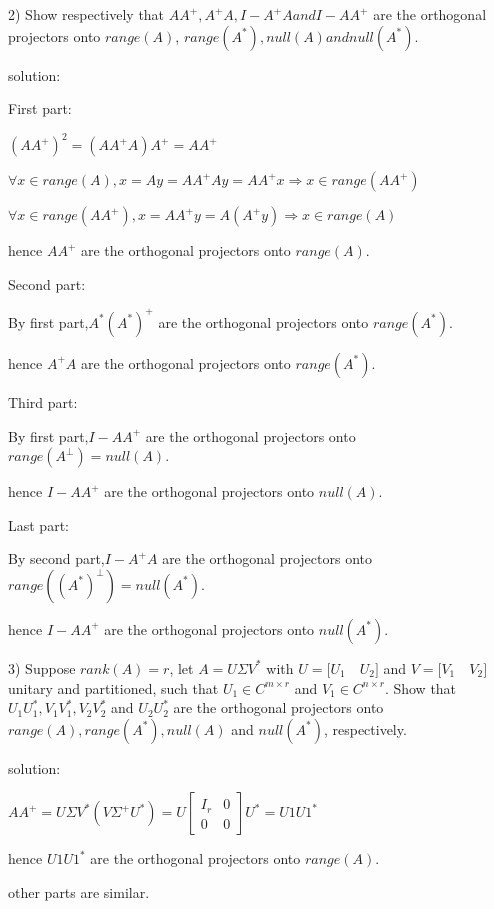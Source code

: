 \documentclass{article}
\begin{document}
\begin{enumerate}
		2) Show respectively that $AA^+, A^+A, I-A^+A and I-AA^+$ are the orthogonal projectors onto $range(A)$, $range(A^*), null(A) and null(A^*)$.
		
		solution:$ $
		
		First part:$ $
		
		$(AA^+)^2=(AA^+A)A^+=AA^+$
		
		$\forall x\in range(A),x=Ay=AA^+Ay=AA^+x 
		\Rightarrow x\in range(AA^+)$
		
		$\forall x\in range(AA^+),x=AA^+y=A(A^+y)
		\Rightarrow x\in range(A)$
		
		hence $AA^+$ are the orthogonal projectors onto $range(A)$.
		
		Second part:$ $
		
		By first part,$A^*(A^*)^+$ are the orthogonal projectors onto $range(A^*)$.
		
		hence $A^+A$ are the orthogonal projectors onto $range(A^*)$.
		
		Third part:$ $
		
		By first part,$I-AA^+$ are the orthogonal projectors onto $range(A^\perp )=null(A)$.
		
		hence $I-AA^+$ are the orthogonal projectors onto $null(A)$.
		
		Last part:$ $
		
		By second part,$I-A^+A$ are the orthogonal projectors onto $range((A^*)^\perp )=null(A^*)$.
		
		hence $I-AA^+$ are the orthogonal projectors onto $null(A^*)$.
		
		3) Suppose $rank(A)=r$, let $A = U\Sigma V^*$ with $ U = \lbrack U_1 \quad U_2 \rbrack$ and	$V = \lbrack V_1 \quad V_2\rbrack$ unitary and partitioned, such that $U_1 \in C^{m \times r}$ and $V_1 \in C^{n \times r}$. Show that $U_1U_1^*, V_1V_1^*, V_2V_2^*$ and $U_2U_2^*$ are the orthogonal projectors onto $range(A), range(A^*), null(A)$ and $null(A^*)$, respectively.
		
		solution:$ $
		
		$AA^+=U\Sigma V^*(V\Sigma ^+ U^*)
		=U
		 \begin{bmatrix} I_r&0\\0&0 \end{bmatrix} 
		 U^*
		 =U1U1^*$
		 
		 hence $U1U1^*$ are the orthogonal projectors onto $range(A)$.
		 
		 other parts are similar. 
		
	\end{enumerate}
\end{document}
